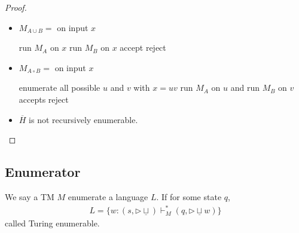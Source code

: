 \begin{proof}\quad

    \begin{itemize}
        \item $M_{A\cup B}=$ on input $x$
        \begin{algorithm}[H]
            \caption{$M_{A\cup B}$}
            \begin{algorithmic}
                \State run $M_A$ on $x$
                \State run $M_B$ on $x$
                    accept
                \Else
                    \quad reject
                \EndIf
            \end{algorithmic}
        \end{algorithm}
        \item $M_{A\circ B}=$ on input $x$
        \begin{algorithm}[H]
            \caption{$M_{A\circ B}$}
            \begin{algorithmic}
                \State enumerate all possible $u$ and $v$ with $x=uv$
                \State run $M_A$ on $u$ and run $M_B$ on $v$
                    accepts
                \Else
                    \quad reject
                \EndIf
            \end{algorithmic}
        \end{algorithm}
        
        \item $\overline{H}$ is not recursively enumerable. 
    \end{itemize}
\end{proof}

\subsection{Enumerator}

\begin{definition}
    We say a TM $M$ enumerate a language $L$. If for some state $q$, 
    \begin{align*}
        L=\{ w: (s,\triangleright \underline{\sqcup})\vdash_M^*(q,\triangleright \underline{\sqcup} w) \}
    \end{align*}
    called Turing enumerable. 
\end{definition}

